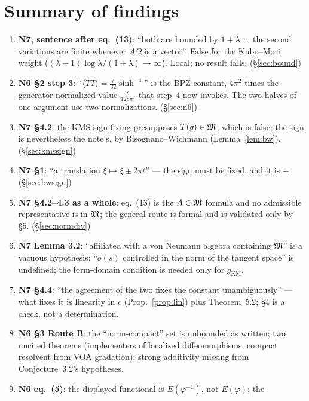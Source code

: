 \documentclass[11pt]{article}
\begin{document}
\section{Summary of findings}\label{sec:summary}
\begin{enumerate}[leftmargin=1.6em]
\item[\textbf{BREAK}] \textbf{N7, sentence after eq.~(13)}: ``both are bounded by $1+\lambda$ \dots\ the second
variations are finite whenever $A\Omega$ is a vector''.  False for the Kubo--Mori weight
($(\lambda-1)\log\lambda/(1+\lambda)\to\infty$).  Local; no result falls.  (\S\ref{sec:bound})
\item[\textbf{BREAK}] \textbf{N6 \S2 step 3}: ``$\langle\widetilde T\widetilde T\rangle=\frac c{32}\sinh^{-4}$''
is the BPZ constant, $4\pi^2$ times the generator-normalized value $\frac c{128\pi^2}$ that step~4 now invokes.
The two halves of one argument use two normalizations.  (\S\ref{sec:n6})
\item[\textbf{GAP}] \textbf{N7 \S4.2}: the KMS sign-fixing presupposes $T(g)\in\mathfrak M$, which is false; the sign is
nevertheless the note's, by Bisognano--Wichmann (Lemma~\ref{lem:bw}).  (\S\ref{sec:kmssign})
\item[\textbf{GAP}] \textbf{N7 \S1}: ``a translation $\xi\mapsto\xi\pm2\pi t$'' --- the sign must be fixed, and
it is $-$.  (\S\ref{sec:bwsign})
\item[\textbf{GAP}] \textbf{N7 \S4.2--4.3 as a whole}: eq.~(13) is the $A\in\mathfrak M$ formula and no admissible
representative is in $\mathfrak M$; the general route is formal and is validated only by \S5.  (\S\ref{sec:normdiv})
\item[\textbf{GAP}] \textbf{N7 Lemma 3.2}: ``affiliated with a von Neumann algebra containing $\mathfrak M$'' is a
vacuous hypothesis; ``$o(s)$ controlled in the norm of the tangent space'' is undefined; the form-domain
condition is needed only for $g_{\mathrm{KM}}$.
\item[\textbf{GAP}] \textbf{N7 \S4.4}: ``the agreement of the two fixes the constant unambiguously'' --- what
fixes it is linearity in $c$ (Prop.~\ref{prop:lin}) plus Theorem~5.2; \S4 is a check, not a determination.
\item[\textbf{GAP}] \textbf{N6 \S3 Route B}: the ``norm-compact'' set is unbounded as written; two uncited
theorems (implementers of localized diffeomorphisms; compact resolvent from VOA gradation); strong additivity
missing from Conjecture~3.2's hypotheses.
\item[\textbf{MINOR}] \textbf{N6 eq.~(5)}: the displayed functional is $E(\varphi^{-1})$, not $E(\varphi)$; the

\end{enumerate}
\end{document}
